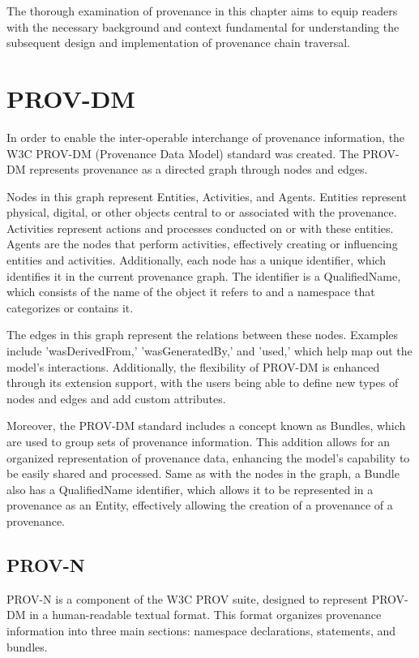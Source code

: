 \documentclass[
  digital,     %
  oneside,     %
  nosansbold,  %
  nocolorbold, %
  lof,         %
  lot,         %
]{fithesis4}
\begin{document}
The thorough examination of provenance in this chapter aims to equip readers with the necessary background and context fundamental for understanding the subsequent design and implementation of provenance chain traversal.

\section{PROV-DM} \label{provdm}
\shorthandoff{-}
In order to enable the inter-operable interchange of provenance information, the W3C PROV-DM (Provenance Data Model) standard was created. The PROV-DM represents provenance as a directed graph through nodes and edges. 

Nodes in this graph represent Entities, Activities, and Agents. Entities represent physical, digital, or other objects central to or associated with the provenance. Activities represent actions and processes conducted on or with these entities. Agents are the nodes that perform activities, effectively creating or influencing entities and activities. Additionally, each node has a unique identifier, which identifies it in the current provenance graph. The identifier is a QualifiedName, which consists of the name of the object it refers to and a namespace that categorizes or contains it.

The edges in this graph represent the relations between these nodes. Examples include 'wasDerivedFrom,' 'wasGeneratedBy,' and 'used,' which help map out the model's interactions. Additionally, the flexibility of PROV-DM is enhanced through its extension support, with the users being able to define new types of nodes and edges and add custom attributes.

Moreover, the PROV-DM standard includes a concept known as Bundles, which are used to group sets of provenance information. This addition allows for an organized representation of provenance data, enhancing the model's capability to be easily shared and processed. Same as with the nodes in the graph, a Bundle also has a QualifiedName identifier, which allows it to be represented in a provenance as an Entity, effectively allowing the creation of a provenance of a provenance.
\shorthandon{-}

\subsection{PROV-N}
\shorthandoff{-}
PROV-N is a component of the W3C PROV suite, designed to represent PROV-DM in a human-readable textual format. This format organizes provenance information into three main sections: namespace declarations, statements, and bundles. 
\end{document}
